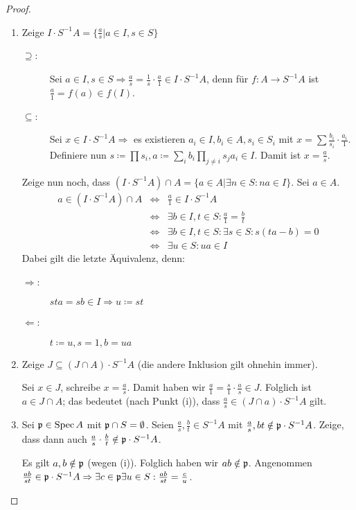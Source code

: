 \documentclass[12pt,a4paper]{scrartcl}
\theoremstyle{cplain}
\theoremstyle{cdef}
\begin{document}
\begin{proof}
	\leavevmode
	\begin{enumerate}
		\item Zeige $I\cdot S^{-1}A = \{\frac as | a\in I, s\in S\}$
		\begin{description}
			\item[\glqq $\supseteq$\grqq:] Sei $a\in I, s\in S\Rightarrow \frac as = \frac 1s\cdot \frac a1\in I\cdot S^{-1}A$, denn für $f\colon A\to S^{-1}A$ ist $\frac a1 = f(a) \in f(I)$.
			\item[\glqq$\subseteq$\grqq:] Sei $x\in I\cdot S^{-1}A\Rightarrow$ es existieren $a_i\in I, b_i\in A, s_i\in S_i$ mit $x = \sum \frac {b_{i}}{s_{i}}\cdot \frac{a_i}1$. Definiere nun $s\coloneqq \prod s_i, a\coloneqq \sum_ib_i\prod_{j\neq i}s_ja_i\in I$. Damit ist $x = \frac a s$.
		\end{description}
		Zeige nun noch, dass $(I\cdot S^{-1}A)\cap A = \{a\in A|\exists n\in S: na\in I\}$. Sei $a\in A$.
		\begin{eqnarray*}
			a\in (I\cdot S^{-1}A)\cap A &\Leftrightarrow & \frac a1\in I\cdot S^{-1}A\\
			&\Leftrightarrow& \exists b \in I, t\in S: \frac a1 = \frac bt\\
			&\Leftrightarrow& \exists b\in I, t\in S: \exists s\in S: s(ta-b) =0\\
			&\Leftrightarrow& \exists u\in S: ua\in I
		\end{eqnarray*}
		Dabei gilt die letzte Äquivalenz, denn:
		\begin{description}
			\item[\glqq$\Rightarrow$\grqq:] $sta = sb\in I\Rightarrow u\coloneqq  st$
			\item[\glqq$\Leftarrow$\grqq:] $t\coloneqq u, s = 1, b = ua$
		\end{description}
		\item Zeige $J\subseteq (J\cap A)\cdot S^{-1}A$ (die andere Inklusion gilt ohnehin immer).
		
		Sei $x\in J$, schreibe $x = \frac as$. Damit haben wir $\frac a1 = \frac s1\cdot \frac as \in J$. Folglich ist $a\in J\cap A$; das bedeutet (nach Punkt (i)), dass $\frac as \in (J\cap a)\cdot S^{-1}A$ gilt.
		\item Sei $\mathfrak{p}\in\operatorname{Spec} A$ mit $\mathfrak{p}\cap S=\emptyset$. Seien $\frac as, \frac bt\in S^{-1}A$ mit $\frac as,bt\notin \mathfrak{p}\cdot S^{-1}A$. Zeige, dass dann auch $\frac as\cdot \frac bt\notin\mathfrak{p}\cdot S^{-1}A$.
		
		Es gilt $a,b\notin \mathfrak{p}$ (wegen (i)). Folglich haben wir $ab\notin \mathfrak{p}$. Angenommen $\frac{ab}{st}\in\mathfrak{p}\cdot S^{-1}A\Rightarrow \exists c\in \mathfrak{p}\exists u\in S: \frac{ab}{st} = \frac cu$.
		

\end{enumerate}
\end{proof}
\end{document}
